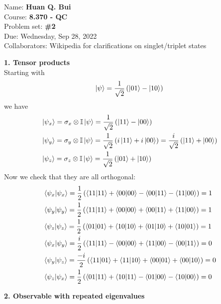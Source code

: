 \documentclass{article}
\theoremstyle{definition}
\newcommand{\f}[2]{\frac{#1}{#2}}
\newcommand{\lp}{\left(}
\newcommand{\rp}{\right)}
\begin{document}
\begin{framed}
\noindent Name: \textbf{Huan Q. Bui}\\
Course: \textbf{8.370 - QC}\\
Problem set: \textbf{\#2}\\
Due: Wednesday, Sep 28, 2022\\
Collaborators: Wikipedia for clarifications on singlet/triplet states
\end{framed}

\noindent \textbf{1. Tensor products}\\

\noindent Starting with
\begin{align*}
	\ket{\psi} = \f{1}{\sqrt{2}}\lp \ket{01} - \ket{10} \rp
\end{align*}
we have
\begin{align*}
	&\ket{\psi_x} = \sigma_x \otimes \mathbb{I} \ket{\psi} = \f{1}{\sqrt{2}}\lp \ket{11} - \ket{00} \rp\\
	&\ket{\psi_y} = \sigma_y \otimes \mathbb{I} \ket{\psi} = \f{1}{\sqrt{2}}\lp i \ket{11} + i \ket{00}   \rp = \f{i}{\sqrt{2}}\lp \ket{11} + \ket{00} \rp\\
	&\ket{\psi_z} = \sigma_z\otimes \mathbb{I} \ket{\psi} = \f{1}{\sqrt{2}}\lp \ket{01} + \ket{10} \rp  
\end{align*}
Now we check that they are all orthogonal:
\begin{align*}
	&\braket{\psi_x} = \f{1}{2}\lp \braket{11} + \braket{00} - \bra{00}\ket{11} - \bra{11}\ket{00}  \rp  = 1 \\
	&\braket{\psi_y} = \frac{1}{2}\lp  \braket{11} + \braket{00}  +  \bra{00}\ket{11} + \bra{11}\ket{00}  \rp = 1\\
	&\braket{\psi_z} = \frac{1}{2}\lp \braket{01} + \braket{10} + \bra{01}\ket{10} + \bra{10}\ket{01}  \rp = 1 \\
	&\bra{\psi_x}\ket{\psi_y} =  \f{i}{2}\lp \braket{11} - \braket{00} + \bra{11}\ket{00} - \bra{00}\ket{11} \rp = 0\\
	& \bra{\psi_y} \ket{\psi_z} = \f{-i}{2}\lp \bra{11}\ket{01} + \bra{11}\ket{10} + \bra{00}\ket{01} +  \bra{00}\ket{10}\rp = 0 \\
	&\bra{\psi_z}\ket{\psi_x} = \f{1}{2}\lp \bra{01}\ket{11} + \bra{10}\ket{11} - \bra{01}\ket{00} - \bra{10}\ket{00} \rp = 0
\end{align*}



\noindent \textbf{2. Observable with repeated eigenvalues}
\end{document}
